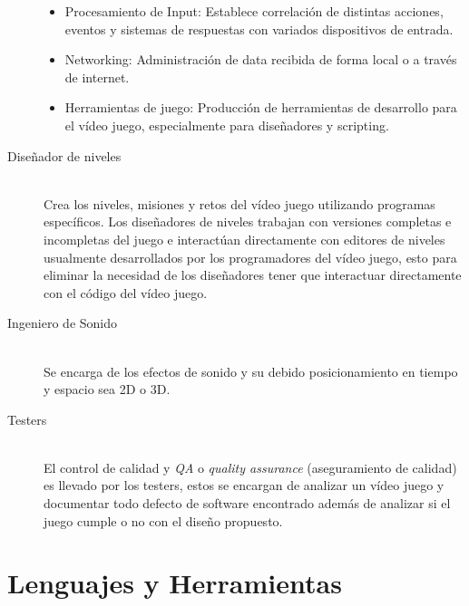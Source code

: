 \begin{description}
\begin{itemize}
\item Procesamiento de Input: Establece correlación de distintas acciones, eventos y sistemas de respuestas con variados dispositivos de entrada.
\item Networking: Administración de data recibida de forma local o a través de internet. 
\item Herramientas de juego: Producción de herramientas de desarrollo para el vídeo juego, especialmente para diseñadores y scripting.
\end{itemize}
\small
\item[Diseñador de niveles] \hfill \\
Crea los niveles, misiones y retos del vídeo juego utilizando programas específicos. Los diseñadores de niveles trabajan con versiones completas e incompletas del juego e interactúan directamente con editores de niveles usualmente desarrollados por los programadores del vídeo juego, esto para eliminar la necesidad de los diseñadores tener que interactuar directamente con el código del vídeo juego.
\item[Ingeniero de Sonido] \hfill \\
Se encarga de los efectos de sonido y su debido posicionamiento en tiempo y espacio sea 2D o 3D.
\item[Testers] \hfill \\
El control de calidad y \emph{QA} o \emph{quality assurance} (aseguramiento de calidad) es llevado por los testers, estos se encargan de analizar un vídeo juego y documentar todo defecto de software encontrado además de analizar si el juego cumple o no con el diseño propuesto.
\end{description}

\section{Lenguajes y Herramientas}

